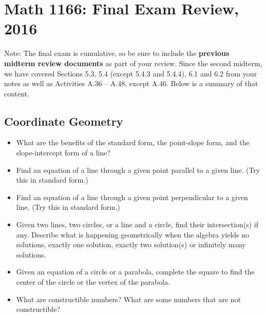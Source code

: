 \newpage

\section{Math 1166: Final Exam Review, 2016}

Note:  The final exam is cumulative, so be sure to include the \textbf{previous midterm review documents} as part of your review.  
Since the second midterm, we have covered Sections 5.3, 5.4 (except 5.4.3 and 5.4.4), 6.1 and 6.2 from your notes as well as Activities A.36 -- A.48, except A.46.  Below is a summary of that content.  


\subsection*{Coordinate Geometry}
\begin{itemize}\itemsep-3pt
\item What are the benefits of the standard form, the point-slope form, and the slope-intercept form of a line?  
\item Find an equation of a line through a given point parallel to a given line.  (Try this in standard form.)  
\item Find an equation of a line through a given point perpendicular to a given line.  (Try this in standard form.) 
\item Given two lines, two circles, or a line and a circle, find their intersection(s) if any.  Describe what is happening geometrically when the algebra yields no solutions, exactly one solution, exactly two solution(s) or infinitely many solutions. 
\item Given an equation of a circle or a parabola, complete the square to find the center of the circle or the vertex of the parabola.  
\item What are constructible numbers?  What are some numbers that are not constructible? 
\end{itemize}

